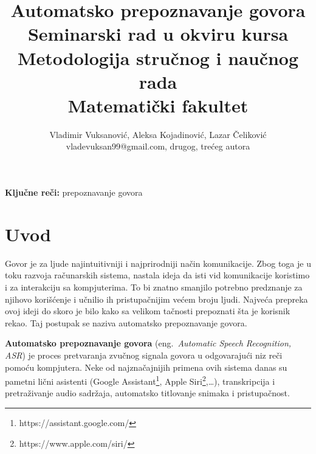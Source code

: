 \documentclass[a4paper]{article}
\begin{document}
\title{Automatsko prepoznavanje govora\\ \small{Seminarski rad u okviru kursa\\Metodologija stručnog i naučnog rada\\Matematički fakultet}}

\author{Vladimir Vuksanović, Aleksa Kojadinović, Lazar Čeliković\\vladevuksan99@gmail.com, drugog, trećeg autora}


\maketitle


\bigskip
\textbf{Ključne reči:} prepoznavanje govora

\tableofcontents

\newpage

\section{Uvod}
\label{sec:uvod}

Govor je za ljude najintuitivniji i najprirodniji način komunikacije. 
Zbog toga je u toku razvoja računarskih sistema, nastala ideja da isti vid komunikacije koristimo i za interakciju sa kompjuterima.
To bi znatno smanjilo potrebno predznanje za njihovo korišćenje i učnilio ih pristupačnijim većem broju ljudi. 
Najveća prepreka ovoj ideji do skoro je bilo kako sa velikom tačnosti prepoznati šta je korisnik rekao.
Taj postupak se naziva automatsko prepoznavanje govora.

\textbf{Automatsko prepoznavanje govora} (eng.~{\em Automatic Speech Recognition, ASR}) je proces pretvaranja zvučnog signala govora u odgovarajući niz reči pomoću kompjutera.
Neke od najznačajnijih primena ovih sistema danas su pametni lični asistenti (Google Assistant\footnote{https://assistant.google.com/}, Apple Siri\footnote{https://www.apple.com/siri/},\dots), transkripcija i pretraživanje audio sadržaja, automatsko titlovanje snimaka i pristupačnost.
\end{document}
